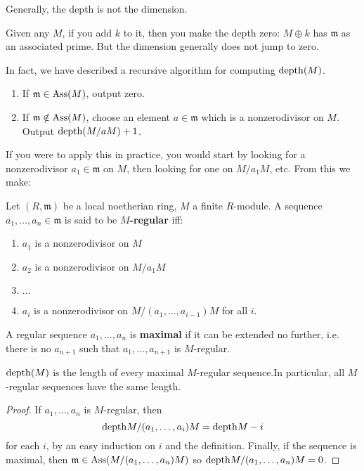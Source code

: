 Generally, the depth is not the dimension.
\begin{example} 
Given any $M$, if you add $k$ to it, then you make the depth
zero: $M \oplus k$
has $\mathfrak{m}$ as an associated prime. But the dimension
generally does not
jump to zero.
\end{example}

In fact, we have described a recursive algorithm for computing
$\mathrm{depth}(M)$.
\begin{enumerate}
\item If $\mathfrak{m}  \in \operatorname{Ass}(M)$, output zero.
\item If $\mathfrak{m} \notin \operatorname{Ass}(M)$, choose an element $a
\in\mathfrak{m}$
which is a nonzerodivisor on $M$. Output $\mathrm{depth}(M/aM) +1$.
\end{enumerate}


If you were to apply this in practice, you would start by
looking for a
nonzerodivisor $a_1 \in \mathfrak{m}$ on $M$, then looking for
one on $M/a_1
M$, etc.
From this we make:

\begin{definition} 
Let $(R, \mathfrak{m})$ be a local noetherian ring, $M$ a finite
$R$-module. A
sequence $a_1, \dots, a_n \in \mathfrak{m}$ is said to be
\textbf{$M$-regular} iff:
\begin{enumerate}
\item $a_1$ is a nonzerodivisor on $M$ 
\item $a_2$ is a nonzerodivisor on $M/a_1 M$
\item  $\dots$
\item $a_i$ is a nonzerodivisor on $M/(a_1, \dots, a_{i-1})M$
for all $i$.
\end{enumerate}
A regular sequence $a_1, \dots, a_n$ is \textbf{maximal } if it
can be extended
no further, i.e. there is no $a_{n+1}$ such that $a_1, \dots,
a_{n+1}$ is
$M$-regular.
\end{definition} 

\begin{corollary} 
$\mathrm{depth}(M)$ is the length of every maximal $M$-regular
sequence.In particular,
all $M$-regular sequences have the same length. 
\end{corollary} 

\begin{proof} 
If $a_1, \dots, a_n$ is $M$-regular, then
\[ \mathrm{depth} M/(a_1, \dots, a_i)M = \mathrm{depth} M -i  \]
for each $i$, by an easy induction on $i$ and the definition.
Finally, if the sequence is maximal,
then $\mathfrak{m} \in \operatorname{Ass}(M/(a_1, \dots, a_n)M)$ so $\mathrm{depth}
M/(a_1, \dots,
a_n) M = 0$.
\end{proof} 


